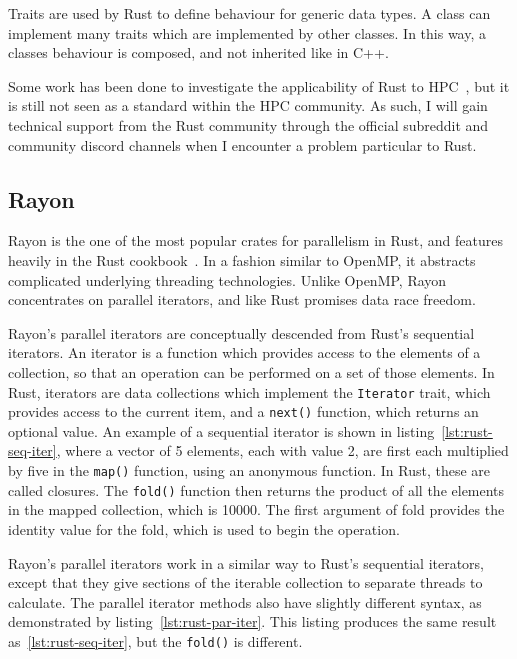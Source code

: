 Traits are used by Rust to define behaviour for generic data types. A class can implement many traits which are implemented by other classes. In this way, a classes behaviour is composed, and not inherited like in C++.

Some work has been done to investigate the applicability of Rust to HPC~\cite{bioinformatics, blanco2016}, but it is still not seen as a standard within the HPC community. As such, I will gain technical support from the Rust community through the official subreddit and community discord channels when I encounter a problem particular to Rust.

\subsection{Rayon}\label{sec:back-rayon}
Rayon is the one of the most popular crates for parallelism in Rust, and features heavily in the Rust cookbook~\cite{RustCookPara}. In a fashion similar to OpenMP, it abstracts complicated underlying threading technologies. Unlike OpenMP, Rayon concentrates on parallel iterators, and like Rust promises data race freedom.

Rayon's parallel iterators are conceptually descended from Rust's sequential iterators. An iterator is a function which provides access to the elements of a collection, so that an operation can be performed on a set of those elements. In Rust, iterators are data collections which implement the \texttt{Iterator} trait, which provides access to the current item, and a \texttt{next()} function, which returns an optional value.
An example of a sequential iterator is shown in listing~\ref{lst:rust-seq-iter}, where a vector of 5 elements, each with value 2, are first each multiplied by five in the \texttt{map()} function, using an anonymous function. In Rust, these are called closures. The \texttt{fold()} function then returns the product of all the elements in the mapped collection, which is 10000. The first argument of fold provides the identity value for the fold, which is used to begin the operation.

Rayon's parallel iterators work in a similar way to Rust's sequential iterators, except that they give sections of the iterable collection to separate threads to calculate. The parallel iterator methods also have slightly different syntax, as demonstrated by listing~\ref{lst:rust-par-iter}. This listing produces the same result as~\ref{lst:rust-seq-iter}, but the \texttt{fold()} is different.


